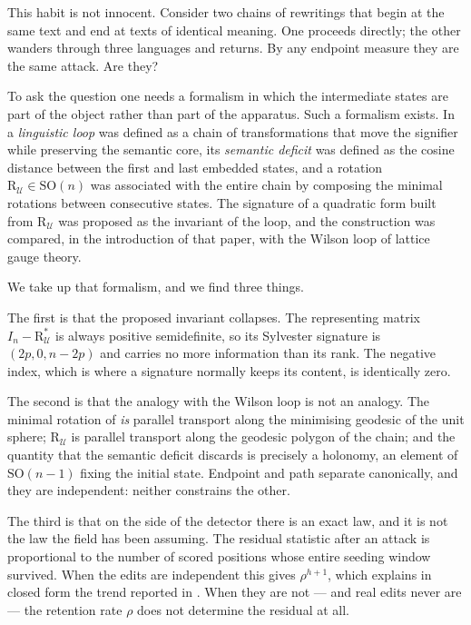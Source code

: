 \documentclass{article}
\theoremstyle{plain}
\theoremstyle{definition}
\numberwithin{equation}{section}
\newcommand{\SO}{\mathrm{SO}}
\newcommand{\Uc}{\mathcal{U}}
\begin{document}
This habit is not innocent. Consider two chains of rewritings that begin
at the same text and end at texts of identical meaning. One proceeds
directly; the other wanders through three languages and returns. By any
endpoint measure they are the same attack. Are they?

To ask the question one needs a formalism in which the intermediate
states are part of the object rather than part of the apparatus. Such a
formalism exists. In \cite{CM25} a \emph{linguistic loop} was defined as
a chain of transformations that move the signifier while preserving the
semantic core, its \emph{semantic deficit} was defined as the cosine
distance between the first and last embedded states, and a rotation
$\mathrm{R}_\Uc \in \SO(n)$ was associated with the entire chain by
composing the minimal rotations between consecutive states. The
signature of a quadratic form built from $\mathrm{R}_\Uc$ was proposed
as the invariant of the loop, and the construction was compared, in the
introduction of that paper, with the Wilson loop of lattice gauge
theory.

We take up that formalism, and we find three things.

The first is that the proposed invariant collapses. The representing
matrix $I_n - \mathrm{R}^{*}_\Uc$ is always positive semidefinite, so its
Sylvester signature is $(2p,0,n-2p)$ and carries no more information
than its rank. The negative index, which is where a signature normally
keeps its content, is identically zero.

The second is that the analogy with the Wilson loop is not an analogy.
The minimal rotation of \cite{CM25} \emph{is} parallel transport along
the minimising geodesic of the unit sphere; $\mathrm{R}_\Uc$ is parallel
transport along the geodesic polygon of the chain; and the quantity that
the semantic deficit discards is precisely a holonomy, an element of
$\SO(n-1)$ fixing the initial state. Endpoint and path separate
canonically, and they are independent: neither constrains the other.

The third is that on the side of the detector there is an exact law, and
it is not the law the field has been assuming. The residual statistic
after an attack is proportional to the number of scored positions whose
entire seeding window survived. When the edits are independent this
gives $\rho^{h+1}$, which explains in closed form the trend reported in
\cite{KGW24}. When they are not --- and real edits never are --- the
retention rate $\rho$ does not determine the residual at all.
\end{document}
